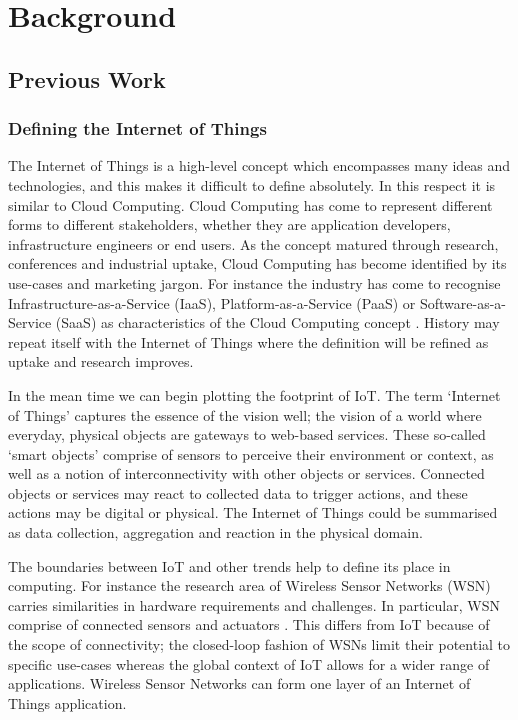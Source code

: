 \chapter{Background}
  \section{Previous Work}
    \subsection{Defining the Internet of Things}
      The Internet of Things is a high-level concept which encompasses many ideas and technologies, and this makes it difficult to define absolutely. In this respect it is similar to Cloud Computing. Cloud Computing has come to represent different forms to different stakeholders, whether they are application developers, infrastructure engineers or end users. As the concept matured through research, conferences and industrial uptake, Cloud Computing has become identified by its use-cases and marketing jargon. For instance the industry has come to recognise Infrastructure-as-a-Service (IaaS), Platform-as-a-Service (PaaS) or Software-as-a-Service (SaaS) as characteristics of the Cloud Computing concept \citep{viewOfCloud}. History may repeat itself with the Internet of Things where the definition will be refined as uptake and research improves.

      In the mean time we can begin plotting the footprint of IoT. The term `Internet of Things' captures the essence of the vision well; the vision of a world where everyday, physical objects are gateways to web-based services. These so-called `smart objects' comprise of sensors to perceive their environment or context, as well as a notion of interconnectivity with other objects or services. Connected objects or services may react to collected data to trigger actions, and these actions may be digital or physical. The Internet of Things could be summarised as data collection, aggregation and reaction in the physical domain.

      The boundaries between IoT and other trends help to define its place in computing. For instance the research area of Wireless Sensor Networks (WSN) carries similarities in hardware requirements and challenges. In particular, WSN comprise of connected sensors and actuators \citep{Mottola:2011}. This differs from IoT because of the scope of connectivity; the closed-loop fashion of WSNs limit their potential to specific use-cases whereas the global context of IoT allows for a wider range of applications. Wireless Sensor Networks can form one layer of an Internet of Things application.

